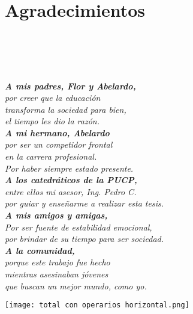 
\newpage
\clearpage{\pagestyle{empty}\cleardoublepage}
\newpage

\chapter*{\centering \large Agradecimientos}

\begin{flushright}
	\; \\
	\; \\
	\; \\
	\; \\
	\textit{\textbf{A mis padres, Flor y Abelardo,}} \\
	\textit{por creer que la educación} \\
	\textit{transforma la sociedad para bien,} \\
	\textit{el tiempo les dio la razón.} \\
	\textit{\textbf{A mi hermano, Abelardo}} \\
	\textit{por ser un competidor frontal} \\
	\textit{en la carrera profesional.} \\
	\textit{Por haber siempre estado presente.} \\
	\textit{\textbf{A los catedráticos de la PUCP,}} \\
	\textit{entre ellos mi asesor, Ing. Pedro C.} \\
	\textit{por guiar y enseñarme a realizar esta tesis.} \\
	\textit{\textbf{A  mis amigos y amigas,}} \\
	\textit{Por ser fuente de estabilidad emocional,} \\
	\textit{por brindar de su tiempo para ser sociedad.} \\
	\textit{\textbf{A  la comunidad,}} \\
	\textit{porque este trabajo fue hecho} \\
	\textit{mientras asesinaban jóvenes} \\
	\textit{que buscan un mejor mundo, como yo.} \\
	
\end{flushright}



\newpage

\begin{myfigure}[H]
	\footnotesize\centering
	\texttt{[image: total con operarios horizontal.png]}
\end{myfigure}